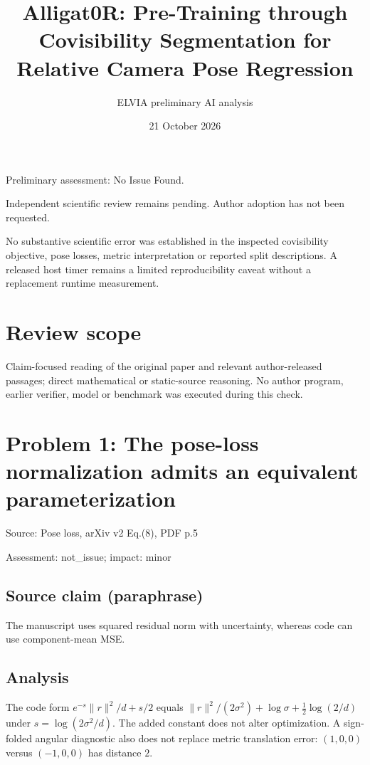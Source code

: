 \documentclass[11pt]{article}
\begin{document}
\title{Alligat0R: Pre-Training through Covisibility Segmentation for Relative Camera Pose Regression}

\author{ELVIA preliminary AI analysis}\date{21 October 2026}\maketitle

Preliminary assessment: No Issue Found.\par

Independent scientific review remains pending. Author adoption has not been requested.

No substantive scientific error was established in the inspected covisibility objective, pose losses, metric interpretation or reported split descriptions. A released host timer remains a limited reproducibility caveat without a replacement runtime measurement.

\section*{Review scope}

Claim-focused reading of the original paper and relevant author-released passages; direct mathematical or static-source reasoning. No author program, earlier verifier, model or benchmark was executed during this check.

\section*{Problem 1: The pose-loss normalization admits an equivalent parameterization}

Source: Pose loss, arXiv v2 Eq.(8), PDF p.5

Assessment: not\_issue; impact: minor

\subsection*{Source claim (paraphrase)}

The manuscript uses squared residual norm with uncertainty, whereas code can use component-mean MSE.

\subsection*{Analysis}

The code form \(e^{-s}\|r\|^2/d+s/2\) equals \(\|r\|^2/(2\sigma^2)+\log\sigma+\tfrac12\log(2/d)\) under \(s=\log(2\sigma^2/d)\). The added constant does not alter optimization. A sign-folded angular diagnostic also does not replace metric translation error: \((1,0,0)\) versus \((-1,0,0)\) has distance \(2\).
\end{document}

